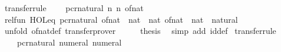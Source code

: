 \begin{isabellebody}
\endisatagproof
{\isafoldproof}%
%
\isadelimproof
\isanewline
%
\endisadelimproof
\isanewline
{}\isamarkupfalse%
\ {\isacharbrackleft}{\kern0pt}transfer{\isacharunderscore}{\kern0pt}rule{\isacharbrackright}{\kern0pt}{\isacharcolon}{\kern0pt}\isanewline
\ \ {\isacartoucheopen}{\isacharparenleft}{\kern0pt}{\isacharparenleft}{\kern0pt}{\isacharequal}{\kern0pt}{\isacharparenright}{\kern0pt}\ {\isacharequal}{\kern0pt}{\isacharequal}{\kern0pt}{\isacharequal}{\kern0pt}{\isachargreater}{\kern0pt}\ pcr{\isacharunderscore}{\kern0pt}natural{\isacharparenright}{\kern0pt}\ {\isacharparenleft}{\kern0pt}{\isasymlambda}n{\isachardot}{\kern0pt}\ n{\isacharparenright}{\kern0pt}\ of{\isacharunderscore}{\kern0pt}nat{\isacartoucheclose}\isanewline
%
\isadelimproof
%
\endisadelimproof
%
\isatagproof
{}\isamarkupfalse%
\ {\isacharminus}{\kern0pt}\isanewline
\ \ \isamarkupfalse%
\ {\isachardoublequoteopen}rel{\isacharunderscore}{\kern0pt}fun\ HOL{\isachardot}{\kern0pt}eq\ pcr{\isacharunderscore}{\kern0pt}natural\ {\isacharparenleft}{\kern0pt}of{\isacharunderscore}{\kern0pt}nat\ {\isacharcolon}{\kern0pt}{\isacharcolon}{\kern0pt}\ nat\ {\isasymRightarrow}\ nat{\isacharparenright}{\kern0pt}\ {\isacharparenleft}{\kern0pt}of{\isacharunderscore}{\kern0pt}nat\ {\isacharcolon}{\kern0pt}{\isacharcolon}{\kern0pt}\ nat\ {\isasymRightarrow}\ natural{\isacharparenright}{\kern0pt}{\isachardoublequoteclose}\isanewline
\ \ \ \ \isamarkupfalse%
\ {\isacharparenleft}{\kern0pt}unfold\ of{\isacharunderscore}{\kern0pt}nat{\isacharunderscore}{\kern0pt}def{\isacharparenright}{\kern0pt}\ transfer{\isacharunderscore}{\kern0pt}prover\isanewline
\ \ \isamarkupfalse%
\ \isamarkupfalse%
\ {\isacharquery}{\kern0pt}thesis\ \isamarkupfalse%
\ {\isacharparenleft}{\kern0pt}simp\ add{\isacharcolon}{\kern0pt}\ id{\isacharunderscore}{\kern0pt}def{\isacharparenright}{\kern0pt}\isanewline
{}\isamarkupfalse%
%
\endisatagproof
{\isafoldproof}%
%
\isadelimproof
\isanewline
%
\endisadelimproof
\isanewline
{}\isamarkupfalse%
\ {\isacharbrackleft}{\kern0pt}transfer{\isacharunderscore}{\kern0pt}rule{\isacharbrackright}{\kern0pt}{\isacharcolon}{\kern0pt}\isanewline
\ \ {\isacartoucheopen}{\isacharparenleft}{\kern0pt}{\isacharparenleft}{\kern0pt}{\isacharequal}{\kern0pt}{\isacharparenright}{\kern0pt}\ {\isacharequal}{\kern0pt}{\isacharequal}{\kern0pt}{\isacharequal}{\kern0pt}{\isachargreater}{\kern0pt}\ pcr{\isacharunderscore}{\kern0pt}natural{\isacharparenright}{\kern0pt}\ numeral\ numeral{\isacartoucheclose}\isanewline

\end{isabellebody}
